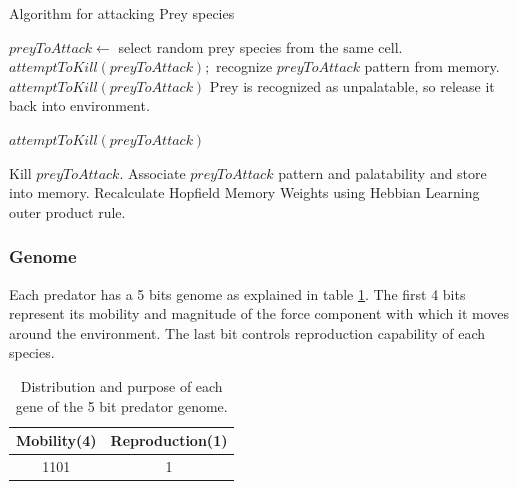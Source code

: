 \documentclass[letterpaper]{article}
\numberwithin{equation}{section}
\begin{document}
\begin{algorithm}[h]
	\caption{Algorithm for attacking Prey species}
	\label{algo:algorithm-attack-prey}
	\begin{algorithmic}
				\STATE $preyToAttack \gets$ select random prey species from the same cell.
					\STATE $attemptToKill(preyToAttack);$ 
				\ELSE
					\STATE recognize $preyToAttack$ pattern from memory.
						\STATE $attemptToKill(preyToAttack)$
					\ELSE 
						\STATE Prey is recognized as unpalatable, so release it back into environment.
					\ENDIF
				\ENDIF
			\ENDIF
		\ENDFOR
	\end{algorithmic}
\end{algorithm}

\begin{algorithm}[h]
	\caption{$attemptToKill(preyToAttack)$}
	\label{algo:algorithm-attemptToKill}
	\begin{algorithmic}
		\STATE Kill $preyToAttack$.
		\IF {Memory size $< MaxMemorySize$}
			\STATE Associate $preyToAttack$ pattern and palatability and store into memory.
			\STATE Recalculate Hopfield Memory Weights using Hebbian Learning outer product rule.
		\ENDIF
	\end{algorithmic}	
\end{algorithm}

\subsubsection{Genome}
Each predator has a 5 bits genome as explained in table \ref{tab:predator-genome}. The first 4 bits represent its mobility and magnitude of the force component with which it moves around the environment. The last bit controls reproduction capability of each species.

\begin{table}[h]
\centering
\begin{tabular}{|c|c|}
	\hline
		\textbf{Mobility(4)} & \textbf{Reproduction(1)} \\ \hline
				 1101					   &					1						 		\\ \hline
\end{tabular}
\caption{Distribution and purpose of each gene of the 5 bit predator genome.}
\label{tab:predator-genome}
\end{table}
\end{document}
